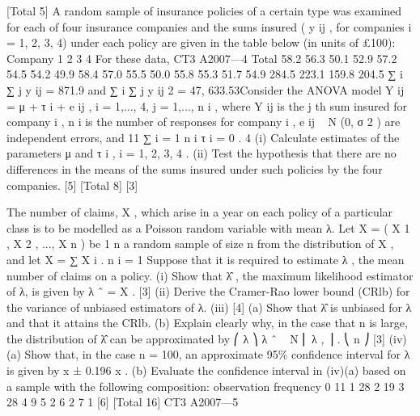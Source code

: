 \documentclass[a4paper,12pt]{article}
\begin{document}
\begin{enumerate}

[Total 5]
A random sample of insurance policies of a certain type was examined for each of
four insurance companies and the sums insured ( y ij , for companies i = 1, 2, 3, 4)
under each policy are given in the table below (in units of £100):
Company
1
2
3
4
For these data,
CT3 A2007—4
Total
58.2
56.3
50.1
52.9
57.2
54.5
54.2
49.9
58.4
57.0
55.5
50.0
55.8
55.3
51.7
54.9
284.5
223.1
159.8
204.5
∑ i ∑ j y ij = 871.9 and ∑ i ∑ j y ij 2 = 47, 633.53Consider the ANOVA model Y ij = μ + τ i + e ij , i = 1,..., 4, j = 1,..., n i , where Y ij is the j th
sum insured for company i , n i is the number of responses for company i ,
e ij ~ N (0, σ 2 ) are independent errors, and
11
∑ i = 1 n i τ i = 0 .
4
(i) Calculate estimates of the parameters μ and τ i , i = 1, 2, 3, 4 .
(ii) Test the hypothesis that there are no differences in the means of the sums
insured under such policies by the four companies.
[5]
[Total 8]
[3]

The number of claims, X , which arise in a year on each policy of a particular class is to be modelled as a Poisson random variable with mean λ. Let X = ( X 1 , X 2 , ..., X n ) be
1 n
a random sample of size n from the distribution of X , and let X = ∑ X i .
n i = 1
Suppose that it is required to estimate λ , the mean number of claims on a policy.
(i) Show that λ̂ , the maximum likelihood estimator of λ, is given by λ ˆ = X . [3]
(ii) Derive the Cramer-Rao lower bound (CRlb) for the variance of unbiased estimators of λ.
(iii)
[4]
(a) Show that λ̂ is unbiased for λ and that it attains the CRlb.
(b) Explain clearly why, in the case that n is large, the distribution of λ̂ can be approximated by
⎛ λ ⎞
λ ˆ ~ N ⎜ λ , ⎟ .
⎝ n ⎠
[3]
(iv)
(a)
Show that, in the case n = 100, an approximate 95\% confidence interval for λ is given by
x ± 0.196 x .
(b)
Evaluate the confidence interval in (iv)(a) based on a sample with the
following composition:
observation
frequency
0
11
1
28
2
19
3
28
4
9
5
2
6
2
7
1
[6]
[Total 16]
CT3 A2007—5


\end{enumerate}
\end{document}
